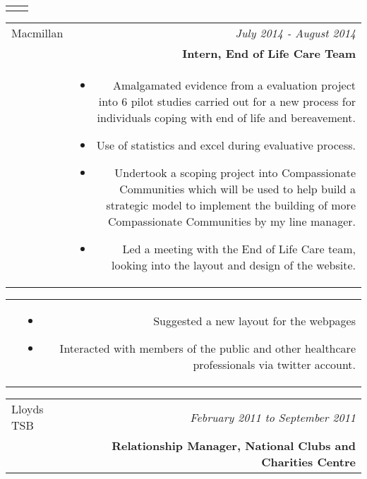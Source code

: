 \documentclass[10pt]{article}
\begin{document}
\begin{flushleft}
\begin{tabular}{L!{\VRule}R}
\begin{itemize}
\end{itemize}

\end{tabular}



\begin{tabular}{L!{\VRule}R}

Macmillan&\textsl{July 2014 - August 2014}\\
&\textbf{Intern, End of Life Care Team}\\

&\vspace{-2mm}

\begin{itemize} \itemsep1pt \parskip0pt 

\item Amalgamated evidence from a evaluation project into 6 pilot studies carried out for a new process for individuals coping with end of life and bereavement. 
\item Use of statistics and excel during evaluative process.
\item Undertook a scoping project into Compassionate Communities which will be used to help build a strategic model to implement the building of more Compassionate Communities by my line manager. 
\item Led a meeting with the End of Life Care team, looking into the layout and design of the website.

\end{itemize} 

\end{tabular}

\begin{tabular}{L!{\VRule}R}

&\begin{itemize} \itemsep1pt \parskip0pt 

\item Suggested a new layout for the webpages
\item Interacted with members of the public and other healthcare professionals via twitter account.

\end{itemize}

\end{tabular}



\begin{tabular}{L!{\VRule}R}

Lloyds TSB&\textsl{February 2011 to September 2011}\\
&\textbf{Relationship Manager, National Clubs and Charities Centre}\\


\end{tabular}
\end{flushleft}
\end{document}
